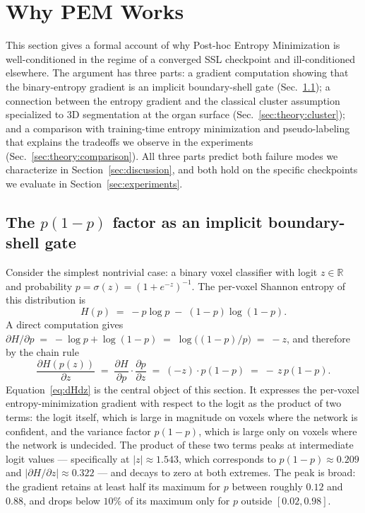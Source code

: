 \section{Why PEM Works}
\label{sec:theory}

This section gives a formal account of why Post-hoc Entropy Minimization is well-conditioned in the regime of a converged SSL checkpoint and ill-conditioned elsewhere. The argument has three parts: a gradient computation showing that the binary-entropy gradient is an implicit boundary-shell gate (Sec.~\ref{sec:theory:p1p}); a connection between the entropy gradient and the classical cluster assumption specialized to 3D segmentation at the organ surface (Sec.~\ref{sec:theory:cluster}); and a comparison with training-time entropy minimization and pseudo-labeling that explains the tradeoffs we observe in the experiments (Sec.~\ref{sec:theory:comparison}). All three parts predict both failure modes we characterize in Section~\ref{sec:discussion}, and both hold on the specific checkpoints we evaluate in Section~\ref{sec:experiments}.

\subsection{The $p(1{-}p)$ factor as an implicit boundary-shell gate}
\label{sec:theory:p1p}

Consider the simplest nontrivial case: a binary voxel classifier with logit $z \in \mathbb{R}$ and probability $p\!=\!\sigma(z)\!=\!(1 + e^{-z})^{-1}$. The per-voxel Shannon entropy of this distribution is
\begin{equation}
H(p) \;=\; -p \log p \;-\; (1-p) \log(1-p).
\end{equation}
A direct computation gives $\partial H/\partial p \;=\; -\log p + \log(1-p) \;=\; \log\!\big((1-p)/p\big) \;=\; -z$, and therefore by the chain rule
\begin{equation}
\frac{\partial H(p(z))}{\partial z} \;=\; \frac{\partial H}{\partial p}\cdot\frac{\partial p}{\partial z} \;=\; (-z)\cdot p(1-p) \;=\; -\,z\,p(1-p).
\label{eq:dHdz}
\end{equation}
Equation~\ref{eq:dHdz} is the central object of this section. It expresses the per-voxel entropy-minimization gradient with respect to the logit as the product of two terms: the logit itself, which is large in magnitude on voxels where the network is confident, and the variance factor $p(1{-}p)$, which is large only on voxels where the network is undecided. The product of these two terms peaks at intermediate logit values --- specifically at $|z| \approx 1.543$, which corresponds to $p(1{-}p) \approx 0.209$ and $|{\partial H/\partial z}| \approx 0.322$ --- and decays to zero at both extremes. The peak is broad: the gradient retains at least half its maximum for $p$ between roughly $0.12$ and $0.88$, and drops below $10\%$ of its maximum only for $p$ outside $[0.02, 0.98]$.

